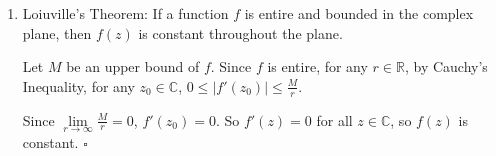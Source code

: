 \documentclass[12pt]{article}
\begin{document}
\begin{enumerate}
    \item Loiuville's Theorem: If a function $f$ is entire and bounded in the complex plane, then $f(z)$ is constant throughout the plane. 
    
    Let $M$ be an upper bound of $f$. Since $f$ is entire, for any $r \in \mathbb{R}$, by Cauchy's Inequality, for any $z_0 \in \mathbb{C}$, $0 \le \left|f'(z_0)\right| \le \frac{M}{r}$.
    
    Since $\lim\limits_{r \to \infty}\frac{M}{r} = 0$, $f'(z_0) = 0$. So $f'(z) = 0$ for all $z \in \mathbb{C}$, so $f(z)$ is constant.  $\square$
\end{enumerate}
\end{document}
